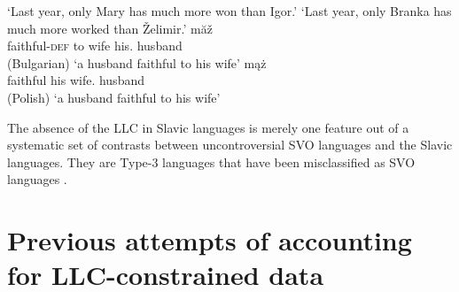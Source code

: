 \documentclass[output=paper
  ,nobabel
  ,uniformtopskip %
]{langscibook}
\begin{document}


\eal
\ex 
{}
\glt `Last year, only Mary has much more won than Igor.'
\ex 
{}
\glt `Last year, only Branka has much more worked than Želimir.'
\ex 
{} măž\\
     \spacebr{}faithful-\textsc{def}  \spacebr{}to wife his. husband\\\hfill(Bulgarian)
\glt `a husband faithful to his wife'
\ex 
{} mąż\\
     \spacebr{}faithful \spacebr{}his wife.\dat{} husband\\\hfill(Polish)
\glt `a husband faithful to his wife'
\zl

\noindent
The absence of the LLC in Slavic languages is merely one feature out of a systematic set of contrasts between uncontroversial SVO languages and the Slavic languages. They are Type-3 languages that have been misclassified as SVO languages \citep{HaiderSzucsich2022a,SzucsichHaider2015}.

\section{Previous attempts of accounting for LLC-constrained data}\label{sec-preattempts}
\end{document}
